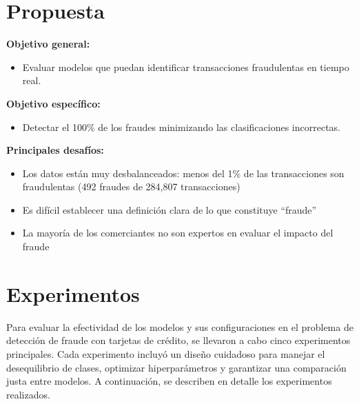 \documentclass[9pt,a4paper,twoside]{rho-class/rho}
\begin{document}
    \section{Propuesta}

        \textbf{Objetivo general:} 
            \begin{itemize}
                \item Evaluar modelos que puedan identificar transacciones fraudulentas en tiempo real.
            \end{itemize}
        \textbf{Objetivo específico:}
            \begin{itemize}
                \item Detectar el 100\% de los fraudes minimizando las clasificaciones incorrectas.
            \end{itemize}
        
        \textbf{Principales desafíos:}
            \begin{itemize}
               \item Los datos están muy desbalanceados: menos del 1\% de las transacciones son fraudulentas (492 fraudes de 284,807 transacciones)
               \item Es difícil establecer una definición clara de lo que constituye ``fraude''
               \item La mayoría de los comerciantes no son expertos en evaluar el impacto del fraude
            \end{itemize}
    \section{Experimentos}
        Para evaluar la efectividad de los modelos y sus configuraciones en el problema de detección de fraude con tarjetas de crédito, se llevaron a cabo cinco experimentos principales. Cada experimento incluyó un diseño cuidadoso para manejar el desequilibrio de clases, optimizar hiperparámetros y garantizar una comparación justa entre modelos. A continuación, se describen en detalle los experimentos realizados.
\end{document}
